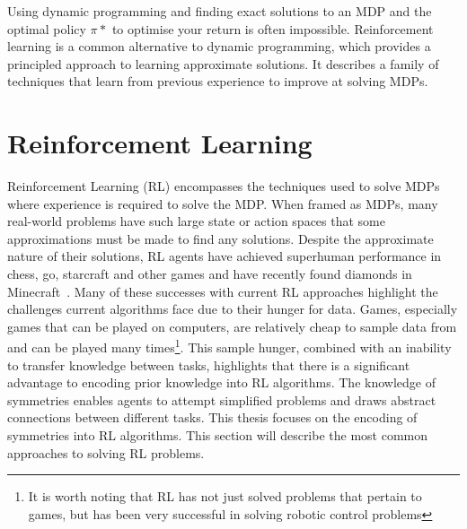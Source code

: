 Using dynamic programming and finding exact solutions to an MDP and the optimal policy $\pi*$ to optimise your return is often impossible. Reinforcement learning is a common alternative to dynamic programming, which provides a principled approach to learning approximate solutions. It describes a family of techniques that learn from previous experience to improve at solving MDPs.

\section{Reinforcement Learning}
Reinforcement Learning (RL) encompasses the techniques used to solve MDPs where experience is required to solve the MDP. When framed as MDPs, many real-world problems have such large state or action spaces that some approximations must be made to find any solutions. Despite the approximate nature of their solutions, RL agents have achieved superhuman performance in chess, go, starcraft and other games and have recently found diamonds in Minecraft~\cite{silver2016mastering,silver2017mastering,hafner2023mastering}. Many of these successes with current RL approaches highlight the challenges current algorithms face due to their hunger for data. Games, especially games that can be played on computers, are relatively cheap to sample data from and can be played many times\footnote{It is worth noting that RL has not just solved problems that pertain to games, but has been very successful in solving robotic control problems}. This sample hunger, combined with an inability to transfer knowledge between tasks, highlights that there is a significant advantage to encoding prior knowledge into RL algorithms. The knowledge of symmetries enables agents to attempt simplified problems and draws abstract connections between different tasks. This thesis focuses on the encoding of symmetries into RL algorithms. This section will describe the most common approaches to solving RL problems.

